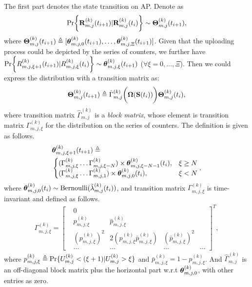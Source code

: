 The first part denotes the state transition on AP.
Denote as
\begin{align}
    \Pr\Brace{
        \vec{R}^{(k)}_{m,j}(t_{i+1}) | \vec{R}^{(k)}_{m,j}(t_{i})
    } \sim \vecG{\Theta}^{(k)}_{m,j}(t_{i+1}),
\end{align}
where $\boldsymbol{\Theta}^{(k)}_{m,j}(t_{i+1}) \triangleq [\boldsymbol{\theta}^{(k)}_{m,j,0}(t_{i+1}), \dots, \boldsymbol{\theta}^{(k)}_{m,j,\Xi}(t_{i+1})]$.
Given that the uploading process could be depicted by the series of counters, we further have
$\Pr\Brace{R^{(k)}_{m,j,\xi+1}(t_{i+1})|R^{(k)}_{m,j,\xi}(t_{i})} \sim \vecG{\theta}^{(k)}_{m,j,\xi}(t_{i+1})$ ($\forall \xi=0,\dots,\Xi$).
Then we could express the distribution with a transition matrix as:
\begin{align}
    \boldsymbol{\Theta}^{(k)}_{m,j}(t_{i+1}) \triangleq \hat{\Gamma}^{(k)}_{m,j}\bigg(\boldsymbol{\Omega}(\mathbf{S}(t_i)) \bigg)\boldsymbol{\Theta}^{(k)}_{m,j}(t_{i}),
\end{align}
where transition matrix $\hat{\Gamma}^{(k)}_{m,j}$ is a \emph{block matrix}, whose element is transition matrix $\Gamma^{(k)}_{m,j,\xi}$ for the distribution on the series of counters. The definition is given as follows.
\begin{align}
    &\boldsymbol{\theta}^{(k)}_{m,j,\xi+1}(t_{i+1}) \triangleq
    \nonumber\\
    &\begin{cases}
        ( \Gamma^{(k)}_{m,j,\xi} \dots \Gamma^{(k)}_{m,j,\xi-N} ) \times \boldsymbol{\theta}^{(k)}_{m,j,\xi-N-1}(t_i), &{\xi \geq N}
        \\
        ( \Gamma^{(k)}_{m,j,\xi} \dots \Gamma^{(k)}_{m,j,1} ) \times \boldsymbol{\theta}^{(k)}_{m,j,0}(t_i), &{\xi < N}
    \end{cases},
\end{align}
where $\boldsymbol{\theta}^{(k)}_{m,j,0}(t_{i}) \sim \text{Bernoulli}(\tilde{\lambda}^{(k)}_{m,j}(t_i))$, and transition matrix $\Gamma^{(k)}_{m,j,\xi}$ is time-invariant and defined as follows.
\begin{align}
    \Gamma^{(k)}_{m,j,\xi} = 
    \begin{bmatrix}
        &0 \\
        &p^{(k)}_{m,j,\xi} &\bar{p}^{(k)}_{m,j,\xi} \\
        &(p^{(k)}_{m,j,\xi})^2 &2(p^{(k)}_{m,j,\xi}\bar{p}^{(k)}_{m,j,\xi}) &(\bar{p}^{(k)}_{m,j,\xi})^2 \\
        &\dots &\dots &\dots &\dots
    \end{bmatrix}^T,
\end{align}
where $p^{(k)}_{m,j,\xi} \triangleq \Pr\{U^{(k)}_{m,j} < (\xi+1) | U^{(k)}_{m,j}>\xi\}$ and $\bar{p}^{(k)}_{m,j,\xi} = 1 - p^{(k)}_{m,j,\xi}$.
And $\hat{\Gamma}^{(k)}_{m,j}$ is an off-diagonal block matrix plus the horizontal part w.r.t $\boldsymbol{\theta}^{(k)}_{m,j,0}$, with other entries as zero.

